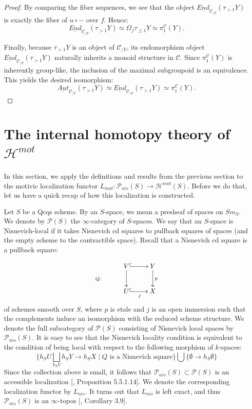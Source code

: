 \begin{proof}
By comparing the fiber sequences, we see that the object $\underline{End}_{\mathcal{C}_{/Y}}(\tau_{>1}Y)$ is exactly the fiber of $u \circ -$ over $f$. Hence:
$$ \underline{End}_{\mathcal{C}_{/Y}}(\tau_{>1}Y) \simeq \Omega_f \tau_{\le 1}Y \simeq \pi_1^\mathcal{C}(Y). $$

Finally, because $\tau_{>1}Y$ is an object of $\mathcal{C}_{/Y}$, its endomorphism object $\underline{End}_{\mathcal{C}_{/Y}}(\tau_{>1}Y)$ naturally inherits a monoid structure in $\mathcal{C}$. Since $\pi_1^\mathcal{C}(Y)$ is inherently group-like, the inclusion of the maximal subgroupoid is an equivalence. This yields the desired isomorphism:
$$ \underline{Aut}_{\mathcal{C}_{/Y}}(\tau_{>1}Y) \simeq \underline{End}_{\mathcal{C}_{/Y}}(\tau_{>1}Y) \simeq \pi_1^\mathcal{C}(Y). $$
\end{proof}

\section{The internal homotopy theory of \texorpdfstring{$\mathcal{H}^{mot}$}{h}}

In this section, we apply the definitions and results from the previous section to the motivic localization functor $L_{mot}:\mathcal{P}_{nis}(S)\to\mathcal{H}^{mot}(S) $. Before we do that, let us have a quick recap of how this localization is constructed.

Let $S$ be a Qcqs scheme. By an $S$-space, we mean a presheaf of spaces on $Sm_S$. We denote by $\mathcal{P}(S)$ the $\infty$-category of $S$-spaces. We say that an $S$-space is Nisnevich-local if it takes Nisnevich cd squares to pullback squares of spaces (and the empty scheme to the contractible space). Recall that a Nisnevich cd square is a pullback square:

\[
\xymatrix{
\ar@{}[d]_{Q:}&V\ar@{^(->}[r]\ar[d]&Y\ar[d]^p\\
&U\ar@{^(->}[r]_j&X
}
\]
of schemes smooth over $S$, where $p$ is etale and $j$ is an open immersion such that the complements induce an isomorphism with the reduced scheme structure. We denote the full subcategory of $\mathcal{P}(S)$ consisting of 
Nisnevich local spaces by $\mathcal{P}_{nis}(S)$. It is easy to see that the Nisnevich locality condition is equivalent to the condition of being local with respect to the following morphism of $k$-spaces:
$$\{h_SU\bigsqcup_{h_SV}h_SY\to h_SX\mid Q \text{ is a Nisnevich square}\}\bigcup \{\emptyset\to h_S\emptyset\}$$ 
Since the collection above is small, it follows that $\mathcal{P}_{nis}(S)\subset \mathcal{P}(S)$ is an accessible localization [\cite{lurie2009higher}, Proposition 5.5.1.14]. We denote the corresponding localization functor by $L_{nis}$. It turns out that $L_{nis}$ is left exact, and thus $\mathcal{P}_{nis}(S)$ is an $\infty$-topos [\cite{hoyois2017six}, Corollary 3.9].


